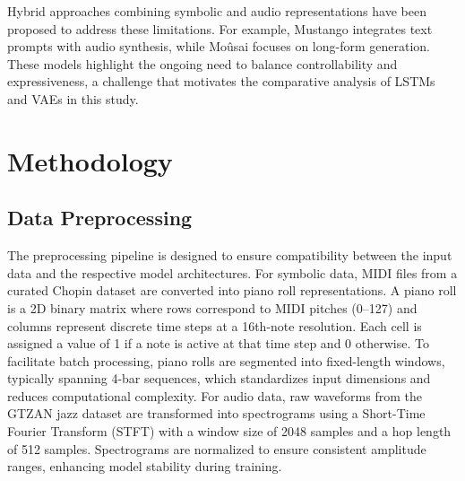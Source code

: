 \documentclass[conference]{IEEEtran}
\begin{document}
Hybrid approaches combining symbolic and audio representations have been proposed to address these limitations. For example, Mustango \cite{melechovsky2024mustangocontrollabletexttomusicgeneration} integrates text prompts with audio synthesis, while Moûsai \cite{schneider2023mousaitexttomusicgenerationlongcontext} focuses on long-form generation. These models highlight the ongoing need to balance controllability and expressiveness, a challenge that motivates the comparative analysis of LSTMs and VAEs in this study.

\section{Methodology}
\label{sec:methodology}

\subsection{Data Preprocessing}
The preprocessing pipeline is designed to ensure compatibility between the input data and the respective model architectures. For symbolic data, MIDI files from a curated Chopin dataset are converted into piano roll representations. A piano roll is a 2D binary matrix where rows correspond to MIDI pitches (0–127) and columns represent discrete time steps at a 16th-note resolution. Each cell is assigned a value of 1 if a note is active at that time step and 0 otherwise. To facilitate batch processing, piano rolls are segmented into fixed-length windows, typically spanning 4-bar sequences, which standardizes input dimensions and reduces computational complexity. For audio data, raw waveforms from the GTZAN jazz dataset are transformed into spectrograms using a Short-Time Fourier Transform (STFT) with a window size of 2048 samples and a hop length of 512 samples. Spectrograms are normalized to ensure consistent amplitude ranges, enhancing model stability during training.

\end{document}
